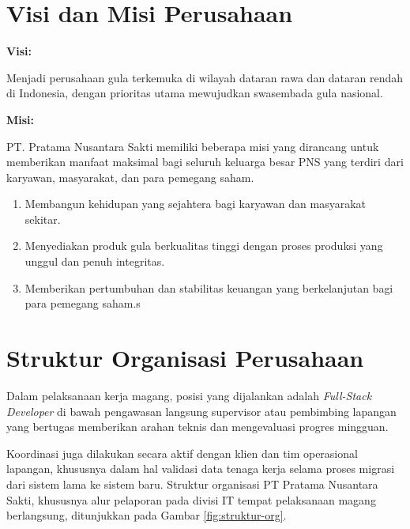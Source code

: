 \section{Visi dan Misi Perusahaan}
 
\textbf{Visi:}
 
\medskip
 
Menjadi perusahaan gula terkemuka di wilayah dataran rawa dan 
dataran rendah di Indonesia, dengan prioritas utama mewujudkan swasembada gula nasional.
 
\vspace{0.5em}
 
\textbf{Misi:}
 
\medskip
 
PT. Pratama Nusantara Sakti memiliki beberapa misi yang dirancang untuk memberikan manfaat maksimal bagi 
seluruh keluarga besar PNS yang terdiri dari karyawan, masyarakat, dan para pemegang saham.
\begin{enumerate}
    \item Membangun kehidupan yang sejahtera bagi karyawan dan masyarakat sekitar.
    \item Menyediakan produk gula berkualitas tinggi dengan proses produksi yang unggul dan penuh integritas.
    \item Memberikan pertumbuhan dan stabilitas keuangan yang berkelanjutan bagi para pemegang saham.s
\end{enumerate}

\section{Struktur Organisasi Perusahaan}

Dalam pelaksanaan kerja magang, posisi yang dijalankan adalah
\textit{Full-Stack Developer} di bawah pengawasan langsung supervisor atau
pembimbing lapangan yang bertugas memberikan arahan teknis dan mengevaluasi
progres mingguan.

Koordinasi juga dilakukan secara aktif dengan klien dan tim
operasional lapangan, khususnya dalam hal validasi data tenaga kerja selama
proses migrasi dari sistem lama ke sistem baru. Struktur organisasi PT Pratama
Nusantara Sakti, khususnya alur pelaporan pada divisi IT tempat pelaksanaan
magang berlangsung, ditunjukkan pada Gambar \ref{fig:struktur-org}.

